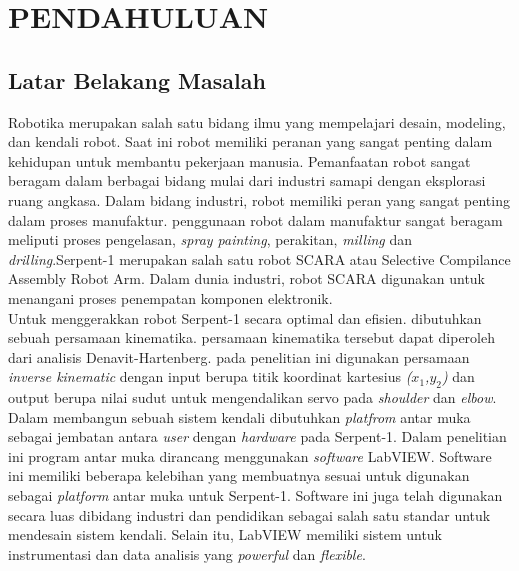 
\chapter{PENDAHULUAN}

\section{Latar Belakang Masalah}

	Robotika merupakan salah satu bidang ilmu yang mempelajari desain, modeling, dan kendali robot. Saat ini robot memiliki peranan yang sangat penting dalam kehidupan untuk membantu pekerjaan manusia. Pemanfaatan robot sangat beragam dalam berbagai bidang mulai dari industri samapi dengan eksplorasi ruang angkasa. Dalam bidang industri, robot memiliki peran yang sangat penting dalam proses manufaktur. penggunaan robot dalam manufaktur sangat beragam meliputi proses pengelasan, \textit{spray painting}, perakitan, \textit{milling} dan \textit{drilling}\cite{Alshamasin2011}.Serpent-1 merupakan salah satu robot SCARA atau Selective Compilance Assembly Robot Arm. Dalam dunia industri, robot SCARA digunakan untuk menangani proses penempatan komponen elektronik\cite{Das2005}.\\
	
	Untuk menggerakkan robot Serpent-1 secara optimal dan efisien. dibutuhkan sebuah persamaan kinematika. persamaan kinematika tersebut dapat diperoleh dari analisis Denavit-Hartenberg. pada penelitian ini digunakan persamaan \textit{inverse kinematic} dengan input berupa titik koordinat kartesius \textit{($x_{1}$,$y_{2}$)} dan output berupa nilai sudut untuk mengendalikan servo pada \textit{shoulder} dan \textit{elbow}\cite{Spong2006}.\\
	
	Dalam membangun sebuah sistem kendali dibutuhkan \textit{platfrom} antar muka sebagai jembatan antara \textit{user} dengan \textit{hardware} pada Serpent-1. Dalam penelitian ini program antar muka dirancang menggunakan \textit{software} LabVIEW. Software ini memiliki beberapa kelebihan yang membuatnya sesuai untuk digunakan sebagai \textit{platform} antar muka untuk Serpent-1. Software ini juga telah digunakan secara luas dibidang industri dan pendidikan sebagai salah satu standar untuk mendesain sistem kendali. Selain itu, LabVIEW memiliki sistem untuk instrumentasi dan data analisis yang \textit{powerful} dan \textit{flexible}\cite{Kaleli2013}.\\
	
